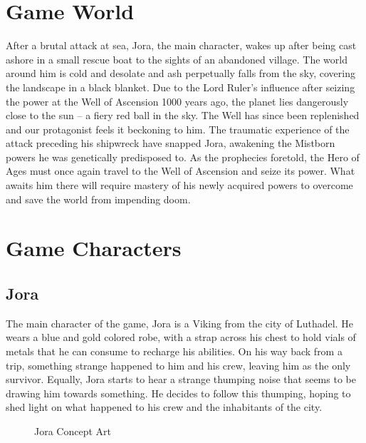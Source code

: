 \documentclass{article}
\begin{document}
\section{Game World}
After a brutal attack at sea, Jora, the main character, wakes up after being cast ashore in a small rescue boat to the sights of an abandoned village. The world around him is cold and desolate and ash perpetually falls from the sky, covering the landscape in a black blanket. Due to the Lord Ruler’s influence after seizing the power at the Well of Ascension 1000 years ago, the planet lies dangerously close to the sun – a fiery red ball in the sky. The Well has since been replenished and our protagonist feels it beckoning to him. The traumatic experience of the attack preceding his shipwreck have snapped Jora, awakening the Mistborn powers he was genetically predisposed to. As the prophecies foretold, the Hero of Ages must once again travel to the Well of Ascension and seize its power. What awaits him there will require mastery of his newly acquired powers to overcome and save the world from impending doom.

\section{Game Characters}

\subsection{Jora}
The main character of the game, Jora is a Viking from the city of Luthadel. He wears a blue and gold colored robe, with a strap across his chest to hold vials of metals that he can consume to recharge his abilities. On his way back from a trip, something strange happened to him and his crew, leaving him as the only survivor. Equally, Jora starts to hear a strange thumping noise that seems to be drawing him towards something. He decides to follow this thumping, hoping to shed light on what happened to his crew and the inhabitants of the city.

\begin{figure}[!htb]
  \caption {Jora Concept Art}
  \end{figure}
\end{document}
